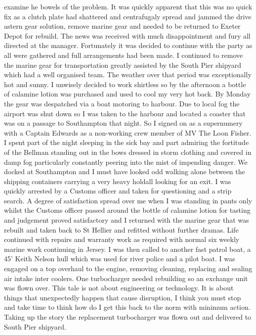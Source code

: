 examine he bowels of the problem.  It was quickly apparent that this was no
quick fix as a clutch plate had shattered and centrafugaly spread and jammed
the drive astern gear solution, remove marine gear and needed to be returned to
Exeter Depot for rebuild.  The news was received with much disappointment and
fury all directed at the manager.  Fortunately it was decided to continue with
the party as all were gathered and full arrangements had been made. I continued
to remove the marine gear for transportation greatly assisted by the South Pier
shipyard which had a well organised team.  The weather over that period was
exceptionally hot and sunny.  I unwisely decided to work shirtless so by the
afternoon a bottle of calamine lotion was purchased and used to cool my very
hot back. By Monday the gear was despatched via a boat motoring to harbour. Due
to local fog the airport was shut down so I was taken to the harbour and
located a coaster that was on a passage to Southampton that night.  So I signed
on as a supernumery with a Captain Edwards as a non-working crew member of MV
The Loon Fisher.  I spent part of the night sleeping in the sick bay and part
admiring the fortitude of the Bellman standing out in the bows dressed in storm
clothing and covered in damp fog particularly constantly peering into the mist
of impending danger. We docked at Southampton and I must have looked odd
walking alone between the shipping containers carrying a very heavy holdall
looking for an exit.  I was quickly arrested by a Customs officer and taken for
questioning and a strip search.  A degree of satisfaction spread over me when I
was standing in pants only whilst the Customs officer passed around the bottle
of calamine lotion for tasting and judgement proved satisfactory and I returned
with the marine gear that was rebuilt and taken back to St Hellier and refitted
without further dramas. Life continued with repairs and warranty work as
required with normal six weekly marine work continuing in Jersey.  I was then
called to another fast patrol boat, a 45' Keith Nelson hull which was used for
river police and a pilot boat.  I was engaged on a top overhaul to the  engine,
removing cleaning, replacing and sealing air intake inter coolers.  One
turbocharger needed rebuilding so an exchange unit was flown over.  This tale
is not about engineering or technology.  It is about things that unexpectedly
happen that cause disruption,  I think you must stop and take time to think how
do I get this back to the norm with minimum action.  Taking up the story the
replacement turbocharger was flown out and delivered to South Pier shipyard.
